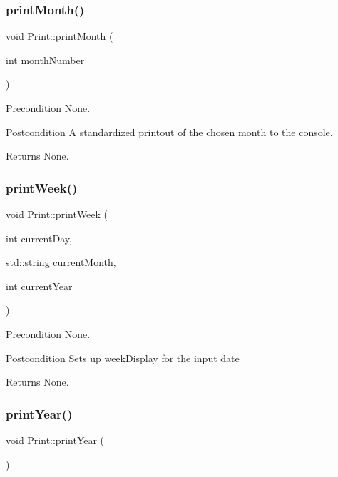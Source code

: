 \subsubsection{\texorpdfstring{print\+Month()}{printMonth()}}
{\footnotesize\ttfamily void Print\+::print\+Month (\begin{DoxyParamCaption}\item[{int}]{month\+Number }\end{DoxyParamCaption})}

\begin{DoxyPrecond}{Precondition}
None. 
\end{DoxyPrecond}
\begin{DoxyPostcond}{Postcondition}
A standardized printout of the chosen month to the console. 
\end{DoxyPostcond}
\begin{DoxyReturn}{Returns}
None. 
\end{DoxyReturn}
\hypertarget{class_print_a5480160313e90ae75d51255bd20a54fe}{}\label{class_print_a5480160313e90ae75d51255bd20a54fe} 
\subsubsection{\texorpdfstring{print\+Week()}{printWeek()}}
{\footnotesize\ttfamily void Print\+::print\+Week (\begin{DoxyParamCaption}\item[{int}]{current\+Day,  }\item[{std\+::string}]{current\+Month,  }\item[{int}]{current\+Year }\end{DoxyParamCaption})}

\begin{DoxyPrecond}{Precondition}
None. 
\end{DoxyPrecond}
\begin{DoxyPostcond}{Postcondition}
Sets up week\+Display for the input date 
\end{DoxyPostcond}
\begin{DoxyReturn}{Returns}
None. 
\end{DoxyReturn}
\hypertarget{class_print_ab38ff940d0abba39ec72485ba3e16259}{}\label{class_print_ab38ff940d0abba39ec72485ba3e16259} 
\subsubsection{\texorpdfstring{print\+Year()}{printYear()}}
{\footnotesize\ttfamily void Print\+::print\+Year (\begin{DoxyParamCaption}{ }\end{DoxyParamCaption})}

